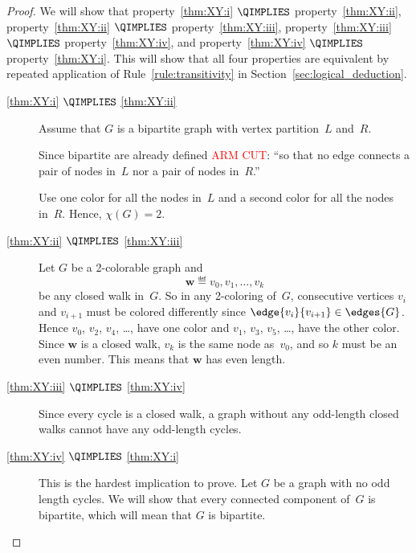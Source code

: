 \begin{editingnotes}
\begin{proof}

We will show that
property~\ref{thm:XY:i} $\QIMPLIES$ property~\ref{thm:XY:ii}, 
property~\ref{thm:XY:ii} $\QIMPLIES$ property~\ref{thm:XY:iii}, 
property~\ref{thm:XY:iii} $\QIMPLIES$ property~\ref{thm:XY:iv}, and
property~\ref{thm:XY:iv} $\QIMPLIES$ property~\ref{thm:XY:i}.  This
will show that all four properties are equivalent by repeated
application of Rule~\ref{rule:transitivity} in
Section~\ref{sec:logical_deduction}.

\begin{description}

\item[\ref{thm:XY:i} $\QIMPLIES$ \ref{thm:XY:ii}]

Assume that $G$ is a bipartite graph with vertex partition~$L$
and~$R$. 
\begin{editingnotes}
Since bipartite are already defined \textcolor{red}{ARM CUT}: ``so that no edge
connects a pair of nodes in~$L$ nor a pair of nodes in~$R$.''
\end{editingnotes}
Use one color for all the nodes in~$L$ and a second color for all the
nodes in~$R$.  Hence, $\chi(G) = 2$.

\item[\ref{thm:XY:ii} $\QIMPLIES$ \ref{thm:XY:iii}]

Let $G$ be a 2-colorable graph and
\begin{equation*}
    \mathbf{w} \eqdef v_0, v_1, \dots, v_k
\end{equation*}
be any closed walk in~$G$.  So in any 2-coloring of~$G$, consecutive
vertices $v_i$ and $v_{i + 1}$ must be colored differently since
$\edge{v_i}{v_{i + 1}} \in \edges{G}$.  
Hence $v_0$, $v_2$, $v_4$, \dots, have one color and $v_1$, $v_3$,
$v_5$, \dots, have the other color.  Since $\mathbf{w}$ is a closed
walk, $v_k$ is the same node as~$v_0$, and so $k$ must be an even
number.  This means that $\mathbf{w}$ has even length.

\item[\ref{thm:XY:iii} $\QIMPLIES$ \ref{thm:XY:iv}]

Since every cycle is a closed walk, a graph without any odd-length
closed walks cannot have any odd-length cycles.

\item[\ref{thm:XY:iv} $\QIMPLIES$ \ref{thm:XY:i}]

This is the hardest implication to prove.  Let $G$ be a graph with no
odd length cycles.  We will show that every connected component of~$G$
is bipartite, which will mean that $G$ is bipartite.


\end{description}
\end{proof}
\end{editingnotes}
